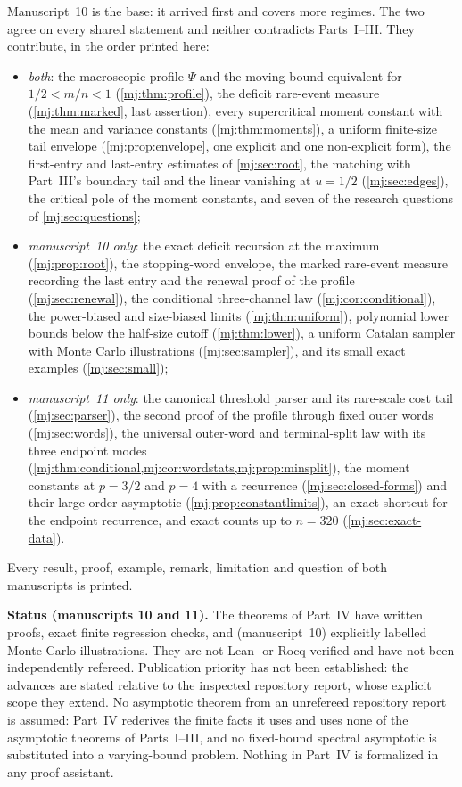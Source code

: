 \documentclass[11pt,a4paper]{article}
\theoremstyle{definition}\newaliascnt{definition}{theorem}
\theoremstyle{remark}\newaliascnt{remark}{theorem}
\begin{document}
Manuscript~10 is the base: it arrived first and covers more regimes. The two
agree on every shared statement and neither contradicts Parts~I--III. They
contribute, in the order printed here:
\begin{itemize}
\item \emph{both}: the macroscopic profile $\Psi$ and the moving-bound
 equivalent for $1/2<m/n<1$ (\cref{mj:thm:profile}), the deficit rare-event
 measure (\cref{mj:thm:marked}, last assertion), every supercritical moment
 constant with the mean and variance constants (\cref{mj:thm:moments}), a
 uniform finite-size tail envelope (\cref{mj:prop:envelope}, one explicit and
 one non-explicit form), the first-entry and last-entry estimates of
 \cref{mj:sec:root}, the matching with Part~III's boundary tail and the
 linear vanishing at $u=1/2$ (\cref{mj:sec:edges}), the critical pole of the
 moment constants, and seven of the research questions of
 \cref{mj:sec:questions};
\item \emph{manuscript~10 only}: the exact deficit recursion at the maximum
 (\cref{mj:prop:root}), the stopping-word envelope, the marked rare-event
 measure recording the last entry and the renewal proof of the profile
 (\cref{mj:sec:renewal}), the conditional three-channel law
 (\cref{mj:cor:conditional}), the power-biased and size-biased limits
 (\cref{mj:thm:uniform}), polynomial lower bounds below the half-size cutoff
 (\cref{mj:thm:lower}), a uniform Catalan sampler with Monte Carlo
 illustrations (\cref{mj:sec:sampler}), and its small exact examples
 (\cref{mj:sec:small});
\item \emph{manuscript~11 only}: the canonical threshold parser and its
 rare-scale cost tail (\cref{mj:sec:parser}), the second proof of the profile
 through fixed outer words (\cref{mj:sec:words}), the universal outer-word
 and terminal-split law with its three endpoint modes
 (\cref{mj:thm:conditional,mj:cor:wordstats,mj:prop:minsplit}), the moment
 constants at $p=3/2$ and $p=4$ with a recurrence
 (\cref{mj:sec:closed-forms}) and their large-order asymptotic
 (\cref{mj:prop:constantlimits}), an exact shortcut for the endpoint
 recurrence, and exact counts up to $n=320$ (\cref{mj:sec:exact-data}).
\end{itemize}
Every result, proof, example, remark, limitation and question of both
manuscripts is printed.

\begin{resultbox}
\textbf{Status (manuscripts 10 and 11).} The theorems of Part~IV have written
proofs, exact finite regression checks, and (manuscript~10) explicitly
labelled Monte Carlo illustrations. They are not Lean- or Rocq-verified and
have not been independently refereed. Publication priority has not been
established: the advances are stated relative to the inspected repository
report, whose explicit scope they extend. No asymptotic theorem from an
unrefereed repository report is assumed: Part~IV rederives the finite facts
it uses and uses none of the asymptotic theorems of Parts~I--III, and no
fixed-bound spectral asymptotic is substituted into a varying-bound problem.
Nothing in Part~IV is formalized in any proof assistant.
\end{resultbox}
\end{document}
